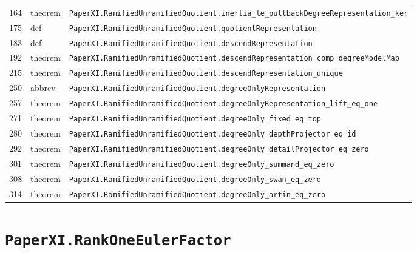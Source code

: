 \documentclass[10pt,oneside]{book}
\begin{document}
\begin{longtable}{@{}p{}p{}p{}@{}}
164&theorem&\nolinkurl{PaperXI.RamifiedUnramifiedQuotient.inertia_le_pullbackDegreeRepresentation_ker}\\

175&def&\nolinkurl{PaperXI.RamifiedUnramifiedQuotient.quotientRepresentation}\\

183&def&\nolinkurl{PaperXI.RamifiedUnramifiedQuotient.descendRepresentation}\\

192&theorem&\nolinkurl{PaperXI.RamifiedUnramifiedQuotient.descendRepresentation_comp_degreeModelMap}\\

215&theorem&\nolinkurl{PaperXI.RamifiedUnramifiedQuotient.descendRepresentation_unique}\\

250&abbrev&\nolinkurl{PaperXI.RamifiedUnramifiedQuotient.degreeOnlyRepresentation}\\

257&theorem&\nolinkurl{PaperXI.RamifiedUnramifiedQuotient.degreeOnlyRepresentation_lift_eq_one}\\

271&theorem&\nolinkurl{PaperXI.RamifiedUnramifiedQuotient.degreeOnly_fixed_eq_top}\\

280&theorem&\nolinkurl{PaperXI.RamifiedUnramifiedQuotient.degreeOnly_depthProjector_eq_id}\\

292&theorem&\nolinkurl{PaperXI.RamifiedUnramifiedQuotient.degreeOnly_detailProjector_eq_zero}\\

301&theorem&\nolinkurl{PaperXI.RamifiedUnramifiedQuotient.degreeOnly_summand_eq_zero}\\

308&theorem&\nolinkurl{PaperXI.RamifiedUnramifiedQuotient.degreeOnly_swan_eq_zero}\\

314&theorem&\nolinkurl{PaperXI.RamifiedUnramifiedQuotient.degreeOnly_artin_eq_zero}\\

\bottomrule\end{longtable}

\section{\texorpdfstring{\nolinkurl{PaperXI.RankOneEulerFactor}}{PaperXI.RankOneEulerFactor}}\label{module:PaperXI.RankOneEulerFactor}
\end{document}
